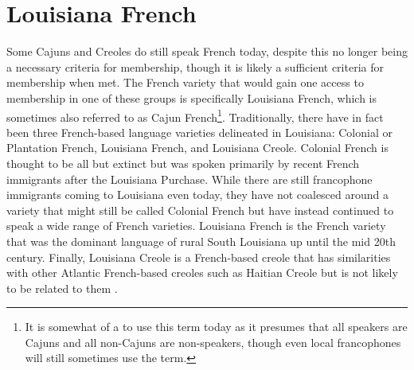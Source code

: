 
\section{Louisiana French}
  Some Cajuns and Creoles do still speak French today, despite this no longer being a necessary criteria for membership, though it is likely a sufficient criteria for membership when met.
  The French variety that would gain one access to membership in one of these groups is specifically Louisiana French, which is sometimes also referred to as Cajun French\footnote{
    It is somewhat of a  to use this term today as it presumes that all speakers are Cajuns and all non-Cajuns are non-speakers, though even local francophones will still sometimes use the term.
  }.
  Traditionally, there have in fact been three French-based language varieties delineated in Louisiana: Colonial or Plantation French, Louisiana French, and Louisiana Creole.
  Colonial French is thought to be all but extinct but was spoken primarily by recent French immigrants after the Louisiana Purchase.
  While there are still francophone immigrants coming to Louisiana even today, they have not coalesced around a variety that might still be called Colonial French but have instead continued to speak a wide range of French varieties.
  Louisiana French is the French variety that was the dominant language of rural South Louisiana up until the mid 20th century.
  Finally, Louisiana Creole is a French-based creole that has similarities with other Atlantic French-based creoles such as Haitian Creole but is not likely to be related to them \parencite[pp.~280-281]{dajko_sociolinguistics_2012}.

